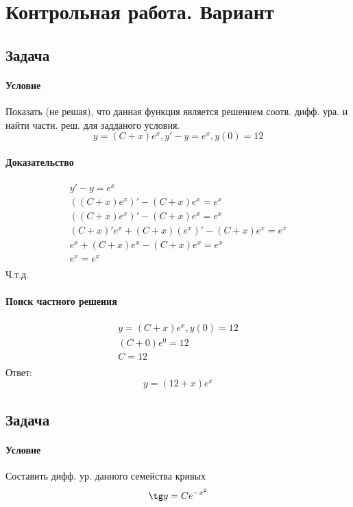 \section{Контрольная работа. Вариант }

\subsection{Задача }
\paragraph{Условие}
Показать (не решая), что данная функция является решением соотв. дифф. ура. и найти частн. реш. для задданого условия.
\[ y = (C + x)e^x, y' - y = e^x, y(0) = 12 \]

\paragraph{Доказательство}
\begin{gather*}
	y' - y = e^x \\
	((C + x)e^x)' - (C + x)e^x = e^x \\
	((C + x)e^x)' - (C + x)e^x = e^x \\
	(C + x)'e^x + (C + x)(e^x)' - (C + x)e^x = e^x \\
	e^x + (C + x)e^x - (C + x)e^x = e^x \\
	e^x = e^x \\
\end{gather*}
Ч.т.д.

\paragraph{Поиск частного решения}
\begin{gather*}
	y = (C + x)e^x, y(0) = 12 \\
	(C + 0)e^0 = 12 \\
	C = 12 \\
\end{gather*}
Ответ:
\[y = (12 + x)e^x\]

\subsection{Задача }
\paragraph{Условие}
Составить дифф. ур. данного семейства кривых
\[ \tg y = Ce^{-x^2} \]

